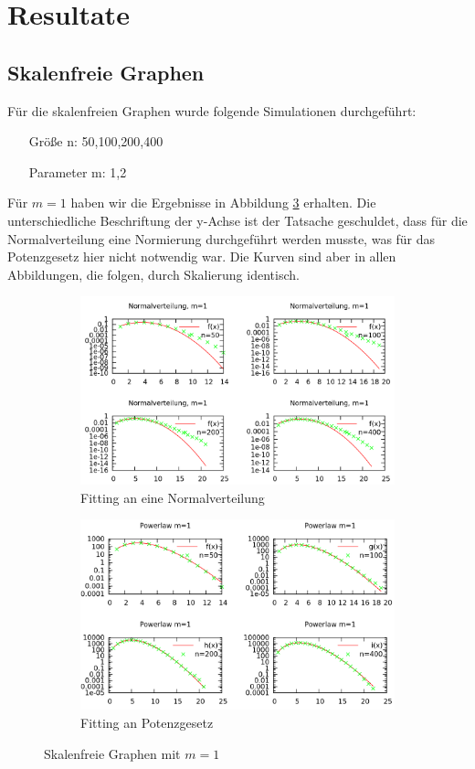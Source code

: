 \documentclass[10pt]{article}
\begin{document}
\section{Resultate}
\subsection{Skalenfreie Graphen}
Für die skalenfreien Graphen wurde folgende Simulationen durchgeführt: \\
\begin{itemize}
\item[Größe n:] 50,100,200,400
\item[Parameter m:] 1,2
\end{itemize}
Für $m=1$ haben wir die Ergebnisse in Abbildung \ref{fig:m1} erhalten. Die unterschiedliche Beschriftung der y-Achse ist der Tatsache geschuldet, dass für die Normalverteilung eine Normierung durchgeführt werden musste, was für das Potenzgesetz hier nicht notwendig war. Die Kurven sind aber in allen Abbildungen, die folgen, durch Skalierung identisch.

\begin{figure}[h!]
\begin{subfigure}{.5\textwidth}
  \centering
  \includegraphics[width=.7\linewidth]{../Results/Normal_M1_logscale.png}
  \caption{Fitting an eine Normalverteilung}
  \label{fig:sfig1}
\end{subfigure}%
\begin{subfigure}{.5\textwidth}
  \centering
  \includegraphics[width=.7\linewidth]{../Results/Power_M1_logscale.png}
  \caption{Fitting an Potenzgesetz}
  \label{fig:sfig2}
\end{subfigure}
\caption{Skalenfreie Graphen mit $m=1$}
\label{fig:m1}
\end{figure}
\end{document}
